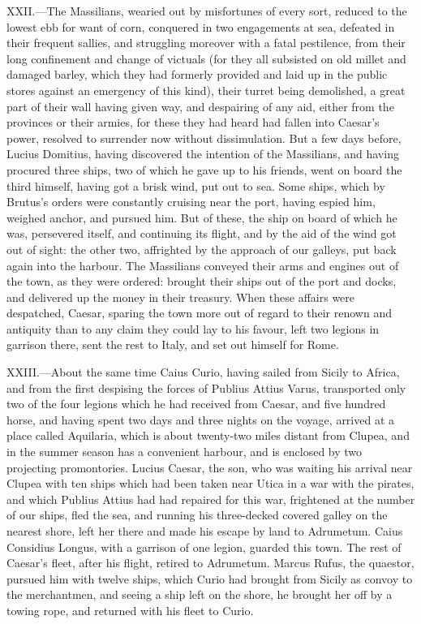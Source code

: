XXII.—The Massilians, wearied out by misfortunes of every sort, reduced
to the lowest ebb for want of corn, conquered in two engagements at sea,
defeated in their frequent sallies, and struggling moreover with a fatal
pestilence, from their long confinement and change of victuals (for they
all subsisted on old millet and damaged barley, which they had formerly
provided and laid up in the public stores against an emergency of this
kind), their turret being demolished, a great part of their wall having
given way, and despairing of any aid, either from the provinces or their
armies, for these they had heard had fallen into Caesar's power,
resolved to surrender now without dissimulation. But a few days before,
Lucius Domitius, having discovered the intention of the Massilians, and
having procured three ships, two of which he gave up to his friends,
went on board the third himself, having got a brisk wind, put out to
sea. Some ships, which by Brutus's orders were constantly cruising near
the port, having espied him, weighed anchor, and pursued him. But of
these, the ship on board of which he was, persevered itself, and
continuing its flight, and by the aid of the wind got out of sight: the
other two, affrighted by the approach of our galleys, put back again
into the harbour. The Massilians conveyed their arms and engines out of
the town, as they were ordered: brought their ships out of the port and
docks, and delivered up the money in their treasury. When these affairs
were despatched, Caesar, sparing the town more out of regard to their
renown and antiquity than to any claim they could lay to his favour,
left two legions in garrison there, sent the rest to Italy, and set out
himself for Rome.

XXIII.—About the same time Caius Curio, having sailed from Sicily to
Africa, and from the first despising the forces of Publius Attius Varus,
transported only two of the four legions which he had received from
Caesar, and five hundred horse, and having spent two days and three
nights on the voyage, arrived at a place called Aquilaria, which is
about twenty-two miles distant from Clupea, and in the summer season has
a convenient harbour, and is enclosed by two projecting promontories.
Lucius Caesar, the son, who was waiting his arrival near Clupea with ten
ships which had been taken near Utica in a war with the pirates, and
which Publius Attius had had repaired for this war, frightened at the
number of our ships, fled the sea, and running his three-decked covered
galley on the nearest shore, left her there and made his escape by land
to Adrumetum. Caius Considius Longus, with a garrison of one legion,
guarded this town. The rest of Caesar's fleet, after his flight, retired
to Adrumetum. Marcus Rufus, the quaestor, pursued him with twelve ships,
which Curio had brought from Sicily as convoy to the merchantmen, and
seeing a ship left on the shore, he brought her off by a towing rope,
and returned with his fleet to Curio.

